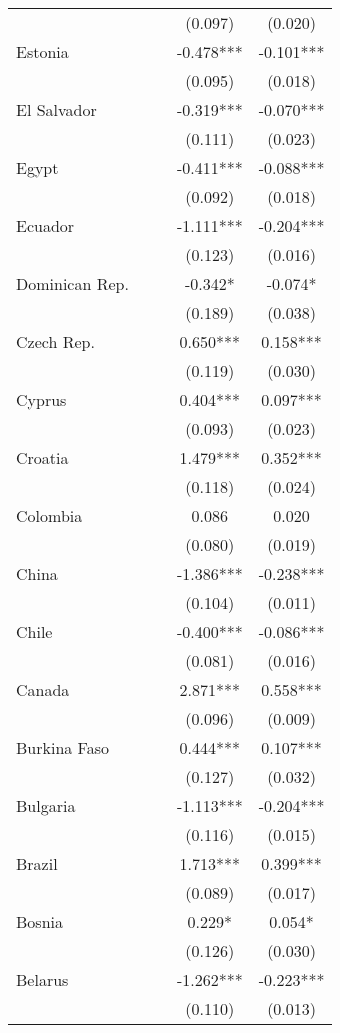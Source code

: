\documentclass[]{article}
\begin{document}
\begin{tabular}{lcccc}
 &  &  & (0.097) & (0.020) \\
Estonia &  &  & -0.478*** & -0.101*** \\
 &  &  & (0.095) & (0.018) \\
El Salvador &  &  & -0.319*** & -0.070*** \\
 &  &  & (0.111) & (0.023) \\
Egypt &  &  & -0.411*** & -0.088*** \\
 &  &  & (0.092) & (0.018) \\
Ecuador &  &  & -1.111*** & -0.204*** \\
 &  &  & (0.123) & (0.016) \\
Dominican Rep. &  &  & -0.342* & -0.074* \\
 &  &  & (0.189) & (0.038) \\
Czech Rep. &  &  & 0.650*** & 0.158*** \\
 &  &  & (0.119) & (0.030) \\
Cyprus &  &  & 0.404*** & 0.097*** \\
 &  &  & (0.093) & (0.023) \\
Croatia &  &  & 1.479*** & 0.352*** \\
 &  &  & (0.118) & (0.024) \\
Colombia &  &  & 0.086 & 0.020 \\
 &  &  & (0.080) & (0.019) \\
China &  &  & -1.386*** & -0.238*** \\
 &  &  & (0.104) & (0.011) \\
Chile &  &  & -0.400*** & -0.086*** \\
 &  &  & (0.081) & (0.016) \\
Canada &  &  & 2.871*** & 0.558*** \\
 &  &  & (0.096) & (0.009) \\
Burkina Faso &  &  & 0.444*** & 0.107*** \\
 &  &  & (0.127) & (0.032) \\
Bulgaria &  &  & -1.113*** & -0.204*** \\
 &  &  & (0.116) & (0.015) \\
Brazil &  &  & 1.713*** & 0.399*** \\
 &  &  & (0.089) & (0.017) \\
Bosnia &  &  & 0.229* & 0.054* \\
 &  &  & (0.126) & (0.030) \\
Belarus &  &  & -1.262*** & -0.223*** \\
 &  &  & (0.110) & (0.013) \\

\end{tabular}
\end{document}
